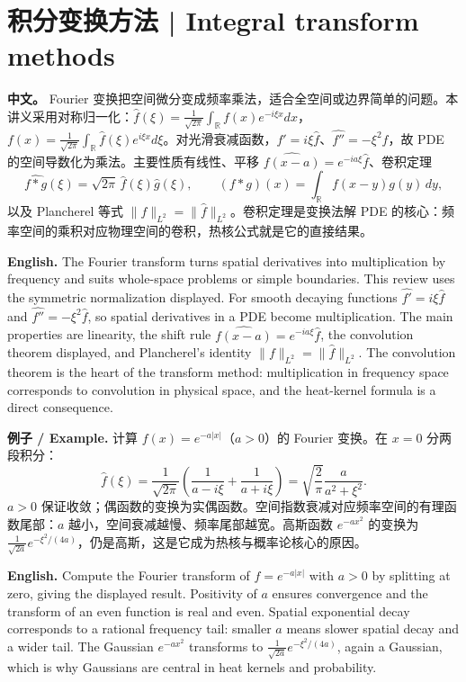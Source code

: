 \documentclass[UTF8,11pt,a4paper]{ctexart}
\newcommand{\EN}[1]{\par\noindent \textbf{English.} #1\par}
\newcommand{\EX}[2]{\par\noindent \textbf{例子 / Example.} #1\par\EN{#2}}
\newcommand{\APS}[2]{\par\noindent\textbf{中文。} #1\par\noindent\textbf{English.} #2\par\smallskip}
\begin{document}
\section[积分变换]{积分变换方法 | Integral transform methods}
\APS{Fourier 变换把空间微分变成频率乘法，适合全空间或边界简单的问题。本讲义采用对称归一化：$\widehat f(\xi)=\frac1{\sqrt{2\pi}}\int_{\mathbb R}f(x)e^{-i\xi x}dx$，$f(x)=\frac1{\sqrt{2\pi}}\int_{\mathbb R}\widehat f(\xi)e^{i\xi x}d\xi$。对光滑衰减函数，$\widehat{f'}=i\xi\widehat f$、$\widehat{f''}=-\xi^2\widehat f$，故 PDE 的空间导数化为乘法。主要性质有线性、平移 $\widehat{f(x-a)}=e^{-ia\xi}\widehat f$、卷积定理
\[
\widehat{f*g}(\xi)=\sqrt{2\pi}\,\widehat f(\xi)\widehat g(\xi),\qquad
(f*g)(x)=\int_{\mathbb R}f(x-y)g(y)\,dy,
\]
以及 Plancherel 等式 $\|f\|_{L^2}=\|\widehat f\|_{L^2}$。卷积定理是变换法解 PDE 的核心：频率空间的乘积对应物理空间的卷积，热核公式就是它的直接结果。}{The Fourier transform turns spatial derivatives into multiplication by frequency and suits whole-space problems or simple boundaries. This review uses the symmetric normalization displayed. For smooth decaying functions $\widehat{f'}=i\xi\widehat f$ and $\widehat{f''}=-\xi^2\widehat f$, so spatial derivatives in a PDE become multiplication. The main properties are linearity, the shift rule $\widehat{f(x-a)}=e^{-ia\xi}\widehat f$, the convolution theorem displayed, and Plancherel's identity $\|f\|_{L^2}=\|\widehat f\|_{L^2}$. The convolution theorem is the heart of the transform method: multiplication in frequency space corresponds to convolution in physical space, and the heat-kernel formula is a direct consequence.}
\EX{计算 $f(x)=e^{-a|x|}$（$a>0$）的 Fourier 变换。在 $x=0$ 分两段积分：
\[
\widehat f(\xi)=\frac1{\sqrt{2\pi}}\left(\frac1{a-i\xi}+\frac1{a+i\xi}\right)=\sqrt{\frac2\pi}\frac{a}{a^2+\xi^2}.
\]
$a>0$ 保证收敛；偶函数的变换为实偶函数。空间指数衰减对应频率空间的有理函数尾部：$a$ 越小，空间衰减越慢、频率尾部越宽。高斯函数 $e^{-ax^2}$ 的变换为 $\frac1{\sqrt{2a}}e^{-\xi^2/(4a)}$，仍是高斯，这是它成为热核与概率论核心的原因。}{Compute the Fourier transform of $f=e^{-a|x|}$ with $a>0$ by splitting at zero, giving the displayed result. Positivity of $a$ ensures convergence and the transform of an even function is real and even. Spatial exponential decay corresponds to a rational frequency tail: smaller $a$ means slower spatial decay and a wider tail. The Gaussian $e^{-ax^2}$ transforms to $\frac1{\sqrt{2a}}e^{-\xi^2/(4a)}$, again a Gaussian, which is why Gaussians are central in heat kernels and probability.}
\end{document}
